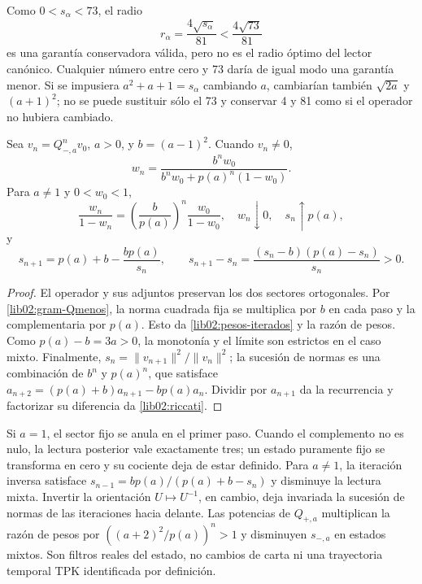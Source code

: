 Como \(0<s_\alpha<73\), el radio
\[
 r_\alpha=\frac{4\sqrt{s_\alpha}}{81}<\frac{4\sqrt{73}}{81}
\]
es una garantía conservadora válida, pero no es el radio óptimo del
lector canónico. Cualquier número entre cero y 73 daría de igual modo
una garantía menor. Si se impusiera \(a^2+a+1=s_\alpha\) cambiando
\(a\), cambiarían también \(\sqrt{2a}\) y \((a+1)^2\); no se
puede sustituir sólo el 73 y conservar 4 y 81 como si el operador no
hubiera cambiado.

\begin{theorem}
\label{lib02:iteraciones}
Sea \(v_n=Q_{-,a}^nv_0\), \(a>0\), y
\(b=(a-1)^2\). Cuando \(v_n\ne0\),
\begin{equation}
 w_n=\frac{b^nw_0}{b^nw_0+p(a)^n(1-w_0)}.
 \label{lib02:pesos-iterados}
\end{equation}
Para \(a\ne1\) y \(0<w_0<1\),
\[
 \frac{w_n}{1-w_n}
 =\left(\frac b{p(a)}\right)^n\frac{w_0}{1-w_0},
 \quad w_n\downarrow0,\quad s_n\uparrow p(a),
\]
y
\begin{equation}
 s_{n+1}=p(a)+b-\frac{bp(a)}{s_n},\qquad
 s_{n+1}-s_n=\frac{(s_n-b)(p(a)-s_n)}{s_n}>0.
 \label{lib02:riccati}
\end{equation}
\end{theorem}
\begin{proof}
El operador y sus adjuntos preservan los dos sectores ortogonales. Por
\eqref{lib02:gram-Qmenos}, la norma cuadrada fija se multiplica por
\(b\) en cada paso y la complementaria por \(p(a)\). Esto da
\eqref{lib02:pesos-iterados} y la razón de pesos. Como
\(p(a)-b=3a>0\), la monotonía y el límite son estrictos en el caso
mixto. Finalmente,
\(s_n=\|v_{n+1}\|^2/\|v_n\|^2\); la sucesión de normas es
una combinación de \(b^n\) y \(p(a)^n\), que satisface
\(a_{n+2}=(p(a)+b)a_{n+1}-bp(a)a_n\). Dividir por
\(a_{n+1}\) da la recurrencia y factorizar su diferencia da
\eqref{lib02:riccati}.
\end{proof}

Si \(a=1\), el sector fijo se anula en el primer paso. Cuando el
complemento no es nulo, la lectura posterior vale exactamente tres;
un estado puramente fijo se transforma en cero y su cociente deja de
estar definido. Para \(a\ne1\), la iteración inversa satisface
\(s_{n-1}=bp(a)/(p(a)+b-s_n)\) y disminuye la lectura mixta.
Invertir la orientación \(U\mapsto U^{-1}\), en cambio, deja
invariada la sucesión de normas de las iteraciones hacia delante.
Las potencias de \(Q_{+,a}\) multiplican la razón de pesos por
\(((a+2)^2/p(a))^n>1\) y disminuyen \(s_{-,a}\) en estados
mixtos. Son filtros reales del estado, no cambios de carta ni una
trayectoria temporal TPK identificada por definición.

